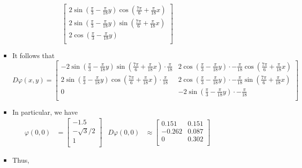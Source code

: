 \documentclass[../notes.tex]{subfiles}
\begin{document}
\begin{itemize}
\begin{itemize}
\begin{itemize}
\begin{equation*}
\begin{bmatrix}
                    2\sin(\frac{\pi}{3}-\frac{\pi}{18}y)\cos(\frac{7\pi}{6}+\frac{\pi}{18}x)\\
                    2\sin(\frac{\pi}{3}-\frac{\pi}{18}y)\sin(\frac{7\pi}{6}+\frac{\pi}{18}x)\\
                    2\cos(\frac{\pi}{3}-\frac{\pi}{18}y)\\
                \end{bmatrix}
            \end{equation*}
            \item It follows that
            \begin{equation*}
                D\varphi(x,y) =
                \begin{bmatrix}
                    -2\sin(\frac{\pi}{3}-\frac{\pi}{18}y)\sin(\frac{7\pi}{6}+\frac{\pi}{18}x)\cdot\frac{\pi}{18} &
                        2\cos(\frac{\pi}{3}-\frac{\pi}{18}y)\cdot -\frac{\pi}{18}\cos(\frac{7\pi}{6}+\frac{\pi}{18}x)\\
                    2\sin(\frac{\pi}{3}-\frac{\pi}{18}y)\cos(\frac{7\pi}{6}+\frac{\pi}{18}x)\cdot\frac{\pi}{18} &
                        2\cos(\frac{\pi}{3}-\frac{\pi}{18}y)\cdot -\frac{\pi}{18}\sin(\frac{7\pi}{6}+\frac{\pi}{18}x)\\
                    0 &
                        -2\sin(\frac{\pi}{3}-\frac{\pi}{18}y)\cdot -\frac{\pi}{18}\\
                \end{bmatrix}
            \end{equation*}
            \item In particular, we have
            \begin{align*}
                \varphi(0,0) &=
                \begin{bmatrix}
                    -1.5\\
                    -\sqrt{3}/2\\
                    1\\
                \end{bmatrix}&
                D\varphi(0,0) &\approx
                \begin{bmatrix}
                    0.151 & 0.151\\
                    -0.262 & 0.087\\
                    0 & 0.302\\
                \end{bmatrix}
            \end{align*}
            \item Thus,

\end{itemize}
\end{itemize}
\end{itemize}
\end{document}
